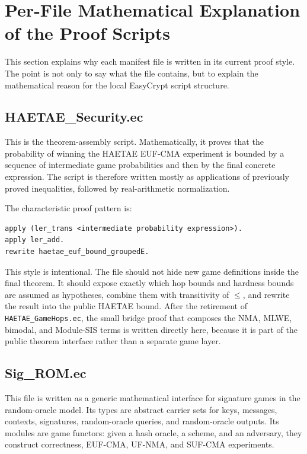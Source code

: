 \documentclass[11pt]{article}
\newcommand{\file}[1]{\nolinkurl{#1}}
\newcommand{\eufcma}{EUF-CMA}
\begin{document}
\section{Per-File Mathematical Explanation of the Proof Scripts}
\label{sec:per-file-proof-script-explanation}

This section explains why each manifest file is written in its current proof
style.  The point is not only to say what the file contains, but to explain the
mathematical reason for the local EasyCrypt script structure.

\subsection*{HAETAE\_Security.ec}

This is the theorem-assembly script.  Mathematically, it proves that the
probability of winning the HAETAE \eufcma{} experiment is bounded by a sequence
of intermediate game probabilities and then by the final concrete expression.
The script is therefore written mostly as applications of previously proved
inequalities, followed by real-arithmetic normalization.

The characteristic proof pattern is:

\begin{lstlisting}[language=EasyCrypt]
apply (ler_trans <intermediate probability expression>).
apply ler_add.
rewrite haetae_euf_bound_groupedE.
\end{lstlisting}

This style is intentional.  The file should not hide new game definitions
inside the final theorem.  It should expose exactly which hop bounds and
hardness bounds are assumed as hypotheses, combine them with transitivity of
\(\leq\), and rewrite the result into the public HAETAE bound.  After the
retirement of \file{HAETAE_GameHops.ec}, the small bridge proof that composes
the NMA, MLWE, bimodal, and Module-SIS terms is written directly here, because
it is part of the public theorem interface rather than a separate game layer.

\subsection*{Sig\_ROM.ec}

This file is written as a generic mathematical interface for signature games in
the random-oracle model.  Its types are abstract carrier sets for keys,
messages, contexts, signatures, random-oracle queries, and random-oracle
outputs.  Its modules are game functors: given a hash oracle, a scheme, and an
adversary, they construct correctness, \eufcma{}, UF-NMA, and SUF-CMA
experiments.
\end{document}
